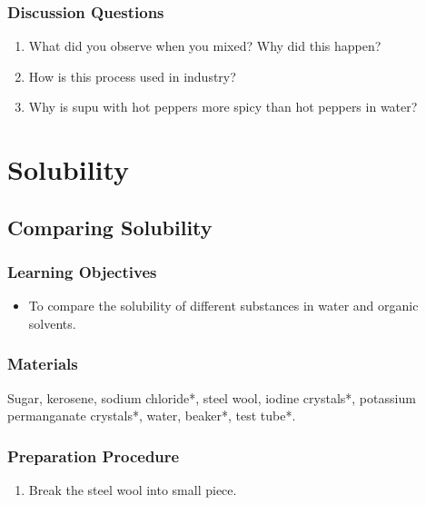 \subsubsection*{Discussion Questions}
\begin{enumerate}
\item{What did you observe when you mixed? Why did this happen?}
\item{How is this process used in industry?}
\item{Why is supu with hot peppers more spicy than hot peppers in water?}
\end{enumerate}




\section{Solubility}

\subsection{Comparing Solubility}

\subsubsection*{Learning Objectives}
\begin{itemize}
\item{To compare the solubility of different substances in water and organic solvents.}
\end{itemize}

\subsubsection*{Materials}
Sugar, kerosene, sodium chloride*, steel wool, iodine crystals*, potassium permanganate crystals*, water, beaker*, test tube*.

\subsubsection*{Preparation Procedure}
\begin{enumerate}
\item{Break the steel wool into small piece.}
\end{enumerate}

